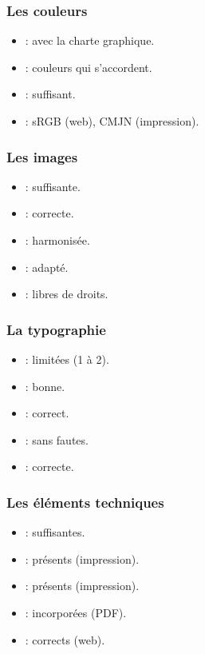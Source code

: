 \subsubsection{Les couleurs}

\begin{itemize}
    \item {} : avec la charte graphique.
    \item {} : couleurs qui s'accordent.
    \item {} : suffisant.
    \item {} : sRGB (web), CMJN (impression).
\end{itemize}

\subsubsection{Les images}

\begin{itemize}
    \item {} : suffisante.
    \item {} : correcte.
    \item {} : harmonisée.
    \item {} : adapté.
    \item {} : libres de droits.
\end{itemize}

\subsubsection{La typographie}

\begin{itemize}
    \item {} : limitées (1 à 2).
    \item {} : bonne.
    \item {} : correct.
    \item {} : sans fautes.
    \item {} : correcte.
\end{itemize}

\subsubsection{Les éléments techniques}

\begin{itemize}
    \item {} : suffisantes.
    \item {} : présents (impression).
    \item {} : présents (impression).
    \item {} : incorporées (PDF).
    \item {} : corrects (web).
\end{itemize}

